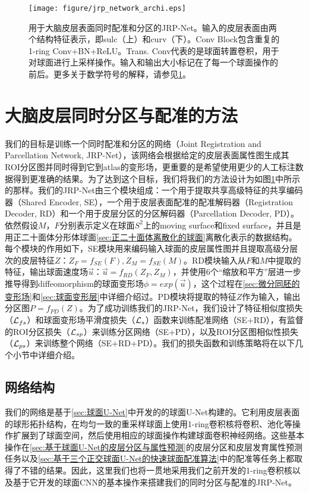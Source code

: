 \begin{figure}[t]
	\centering
	\texttt{[image: figure/jrp\_network\_archi.eps]}
	\caption{用于大脑皮层表面同时配准和分区的JRP-Net。输入的皮层表面由两个结构特征表示，即sulc（上）和curv（下）。Conv Block包含重复的1-ring Conv+BN+ReLU。Trans. Conv代表的是球面转置卷积，用于对球面进行上采样操作。输入和输出大小标记在了每一个球面操作的前后。更多关于数学符号的解释，请参见\ref{sec:大脑皮层同时分区与配准的网络结构}。}\label{fig:jrp_network_archi}
\end{figure}

\section{大脑皮层同时分区与配准的方法}\label{sec:大脑皮层同时分区与配准的网络结构}
我们的目标是训练一个同时配准和分区的网络（Joint Registration and Parcellation Network, JRP-Net），该网络会根据给定的皮层表面属性图生成其ROI分区图并同时得到它到atlas的变形场，更重要的是希望使用更少的人工标注数据得到更准确的结果。为了达到这个目标，我们将我们的方法设计为如图\ref{fig:jrp_network_archi}中所示的那样。我们的JRP-Net由三个模块组成：一个用于提取共享高级特征的共享编码器（Shared Encoder, SE），一个用于皮层表面配准的配准解码器（Registration Decoder, RD）和一个用于皮层分区的分区解码器（Parcellation Decoder, PD）。依然假设$M$，$F$分别表示定义在球面$S^2$上的moving surface和fixed surface，并且是用正二十面体分形体球面\ref{sec:正二十面体离散化的球面}离散化表示的数据结构\cite{fischl2012freesurfer}。每个模块的作用如下，SE模块用来编码输入球面的皮层属性图并且提取高级分层次的皮层特征$Z$：$Z_F=f_{SE}(F), Z_M=f_{SE}(M)$。RD模块输入从$F$和$M$中提取的特征，输出球面速度场$\overrightarrow{u}$：$\overrightarrow{u}=f_{RD}(Z_F,Z_M)$，并使用6个“缩放和平方”层进一步推导得到diffeomorphism的球面变形场$\phi=exp(\overrightarrow{u})$，这个过程在\ref{sec:微分同胚的变形场}和\ref{sec:球面变形层}中详细介绍过。PD模块将提取的特征$Z$作为输入，输出分区图$P=f_{PD}(Z)$。为了成功训练我们的JRP-Net，我们设计了特征相似度损失（${\cal L}_{fs}$）和球面变形场平滑度损失（${\cal L}_s$）函数来训练配准网络（SE+RD），有监督的ROI分区损失（${\cal L}_{sp}$）来训练分区网络（SE+PD），以及ROI分区图相似性损失（${\cal L}_{ps}$）来训练整个网络（SE+RD+PD）。我们的损失函数和训练策略将在以下几个小节中详细介绍。

\subsection{网络结构}\label{sec:大脑皮层同时分区与配准的网络结构2.1}
我们的网络是基于\ref{sec:球面U-Net}中开发的的球面U-Net构建的。它利用皮层表面的球形拓扑结构，在均匀一致的重采样球面上使用1-ring卷积核将卷积、池化等操作扩展到了球面空间，然后使用相应的球面操作构建球面卷积神经网络。这些基本操作在\ref{sec:基于球面U-Net的皮层分区与属性预测}的皮层分区和皮层发育属性预测任务以及\ref{sec:基于三个正交球面U-Net的快速球面配准算法}中的配准等任务上都取得了不错的结果。因此，这里我们也将一贯地采用我们之前开发的1-ring卷积核以及基于它开发的球面CNN的基本操作来搭建我们的同时分区与配准的JRP-Net。

